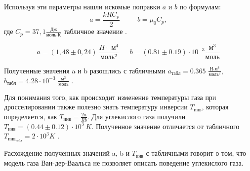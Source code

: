 Используя эти параметры нашли искомые поправки $a$ и $b$ по формулам:
\[a = \frac{kRC_p}{2} \hspace{30pt}  b= \mu_0 C_p,\] где $C_p = 37,1 \frac{\text{Дж}}{\text{моль} \cdot \text{К}}$ табличное значение \cite{Lab}.

\[a  = (1,48 \pm 0,24) \  \frac{H\cdot\text{ м} ^4}{\text{моль} ^2}  \ \ \ \ \ \ \ b = (0.81 \pm 0.19) \cdot 10^{-3} \frac{\text{м} ^3}{\text{моль}}\]

Полученные значения a и b разошлись с табличными $a_{\text{табл}} = 0.365$ $\frac{\text{Н·м}^4}{\text{моль}^2}$, $b_{\text{табл}} = 4.28 \cdot 10^{-3}$ $\frac{\text{м}^3}{\text{моль}}$ \cite{Lab}.

Для понимания того, как происходит изменение температуры газа при дросселировании также полезно знать температуру инверсии $T_{\text{инв}}$, которая определяется, как $T_{\text{инв}} = \frac{2a}{Rb}$. Для углекислого газа получили $T_{\text{инв}} = (0.44 \pm 0.12) \cdot 10^3 \ K$. Полученное значение отличается от табличного $T_{{{\text{инв}}}_{\text{табл}}} = 2 \cdot 10^{3} K$ \cite{Lab}. 

Расхождение полученных значений a, b и $T_\text{инв}$ с табличными говорит о том, что модель газа Ван-дер-Ваальса не позволяет описать поведение углекислого газа.


